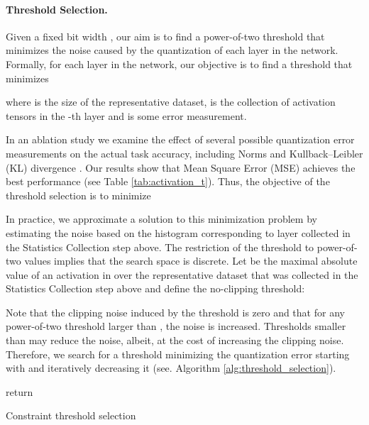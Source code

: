\documentclass{article}
\begin{document}
\paragraph{Threshold Selection.}   



Given a fixed bit width , our aim is to find a power-of-two threshold  that minimizes the noise caused by the quantization of each layer  in the network. Formally, for each layer  in the network, our objective is to find a threshold  that minimizes 

where  is the size of the representative dataset,  is the collection of activation tensors in the -th layer and  is some error measurement.




In an ablation study we examine the effect of several possible quantization error measurements on the actual task accuracy, including  Norms \cite{nahshan2019loss} and Kullback–Leibler (KL) divergence \cite{szymon}.
Our results show that Mean Square Error (MSE) \cite{nahshan2019loss} achieves the best performance (see Table \ref{tab:activation_t}). 
Thus, the objective of the threshold selection is to minimize










In practice, we approximate a solution to this minimization problem by estimating the noise based on the histogram corresponding to layer  collected in the Statistics Collection step above. The restriction of the threshold to power-of-two values implies that the search space is discrete. 
Let   be the maximal absolute value of an activation in  over the representative dataset  that was collected in the Statistics Collection step above and define the no-clipping threshold:
  
Note that the clipping noise induced by the threshold  is zero and that for any power-of-two threshold larger than , the noise is increased.
Thresholds smaller than  may reduce the noise, albeit, at the cost of increasing the clipping noise. 
Therefore, we search for a threshold minimizing the quantization error starting with  and iteratively decreasing it (see. Algorithm \ref{alg:threshold_selection}).

\begin{algorithm}[H]\label{alg:threshold_selection}
  \;
   \;
 return 
 \caption{Constraint threshold selection}
\end{algorithm}
\end{document}
